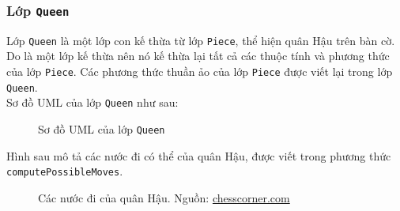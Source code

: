 \subsubsection{Lớp \lstinline{Queen}}
Lớp \lstinline{Queen} là một lớp con kế thừa từ lớp \lstinline{Piece}, thể hiện quân Hậu trên bàn cờ. Do là một lớp kế thừa nên nó kế thừa lại tất cả các thuộc tính và phương thức của lớp \lstinline{Piece}. Các phương thức thuần ảo của lớp \lstinline{Piece} được viết lại trong lớp \lstinline{Queen}.\\
Sơ đồ UML của lớp \lstinline{Queen} như sau:
\begin{figure}[H]
\caption{Sơ đồ UML của lớp \lstinline{Queen}}
\end{figure}
Hình sau mô tả các nước đi có thể của quân Hậu, được viết trong phương thức \lstinline{computePossibleMoves}.
\begin{figure}[H]
\caption{Các nước đi của quân Hậu. Nguồn: \url{chesscorner.com}}
\end{figure}

